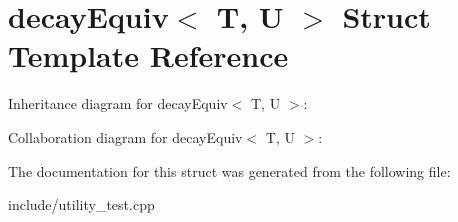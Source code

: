 \hypertarget{structdecayEquiv}{}\section{decay\+Equiv$<$ T, U $>$ Struct Template Reference}
\label{structdecayEquiv}


Inheritance diagram for decay\+Equiv$<$ T, U $>$\+:


Collaboration diagram for decay\+Equiv$<$ T, U $>$\+:


The documentation for this struct was generated from the following file\+:\begin{DoxyCompactItemize}
\item 
include/utility\+\_\+test.\+cpp\end{DoxyCompactItemize}
